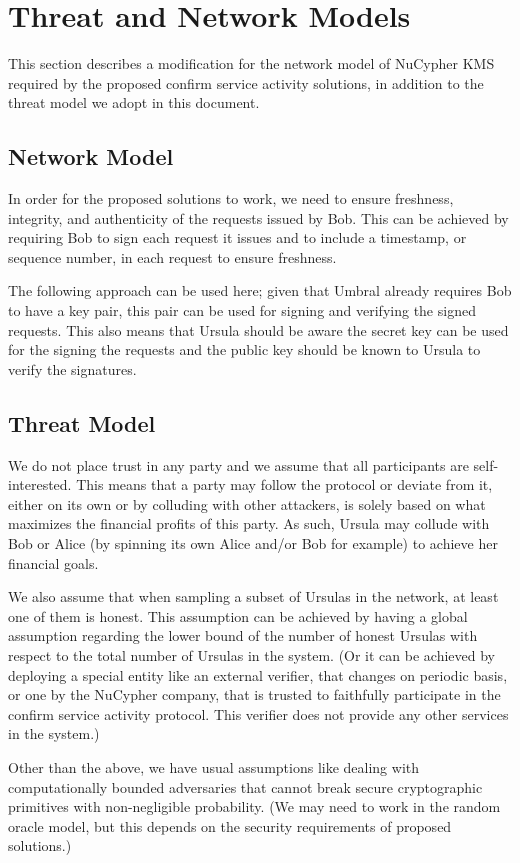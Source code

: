 \section{Threat and Network Models}
\label{threat-network-model}
This section describes a modification for the network model of NuCypher 
KMS required by the proposed confirm service activity solutions, in 
addition to the threat model we adopt in this document.


\subsection{Network Model}
In order for the proposed solutions to work, we need to ensure freshness, 
integrity, and authenticity of the requests issued by Bob. This can be achieved 
by requiring Bob to sign each request it issues and to include a timestamp, or 
sequence number, in each request to ensure freshness.


The following approach can be used here; given that Umbral already requires Bob to 
have a key pair, this pair can be used for signing and verifying the signed requests. 
This also means that Ursula should be aware  the secret key can be used for the 
signing the requests and the public 
key should be known to Ursula to verify the signatures. 


\subsection{Threat Model}
We do not place trust in any party and we assume that all participants are 
self-interested. This means that a party may 
follow the protocol or deviate from it, either on its own or by colluding 
with other attackers, is solely based on what maximizes the financial profits 
of this party. As such, Ursula may collude with Bob or Alice (by spinning 
its own Alice and/or Bob for example) to achieve her financial goals. 


We also assume that when sampling a subset of Ursulas in the network, 
at least one of them is honest. This assumption can be achieved by 
having a global assumption regarding the lower bound of the number of 
honest Ursulas with respect to the total number of Ursulas in the system. 
(Or it can be achieved by deploying a special entity like an external verifier, 
that changes on periodic basis, or one by the NuCypher company, that is 
trusted to faithfully participate in the confirm 
service activity protocol. This verifier does not provide any other services 
in the system.)


Other than the above, we have usual assumptions like dealing with 
computationally bounded adversaries 
that cannot break secure cryptographic primitives with non-negligible probability. 
(We may need to work in the random oracle model, but this depends on the 
security requirements of proposed solutions.)
